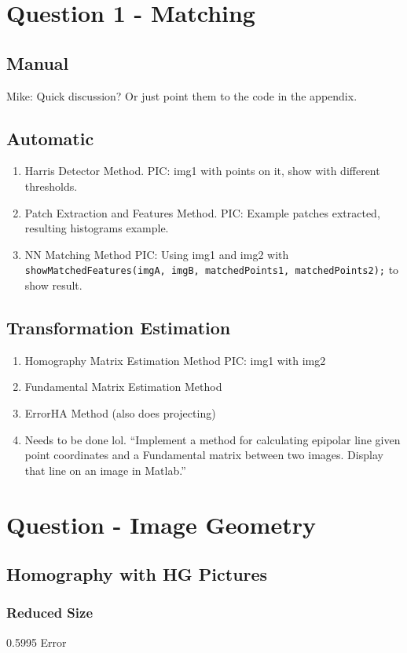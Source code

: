 \documentclass[a4paper, 10pt, conference]{ieeeconf}
\begin{document}
\section{Question 1 - Matching}
\subsection{Manual}
Mike: Quick discussion? Or just point them to the code in the appendix.

\subsection{Automatic}
\begin{enumerate}
    \item Harris Detector Method. PIC: img1 with points on it, show with different thresholds.
    \item Patch Extraction and Features Method. PIC: Example patches extracted, resulting histograms example.
    \item NN Matching Method PIC: Using img1 and img2 with
    \texttt{showMatchedFeatures(imgA, imgB, matchedPoints1, matchedPoints2);} to show result.
\end{enumerate}

\subsection{Transformation Estimation}
\begin{enumerate}
    \item Homography Matrix Estimation Method PIC: img1 with img2
    \item Fundamental Matrix Estimation Method
    \item ErrorHA Method (also does projecting)
    \item Needs to be done lol. ``Implement a method for calculating epipolar line given point coordinates and a
Fundamental matrix between two images. Display that line on an image in Matlab.''
\end{enumerate}

\section{Question - Image Geometry}
\subsection{Homography with HG Pictures}
\subsubsection{Reduced Size}
0.5995 Error
\end{document}

